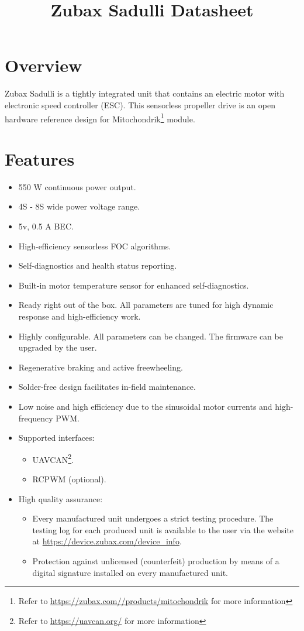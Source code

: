 \documentclass{zubaxdoc}
\title{Zubax Sadulli Datasheet}
\begin{document}
\frontmatter
\begin{titlepage}

\section*{Overview}

Zubax Sadulli is a tightly integrated unit that contains an electric motor with electronic speed controller (ESC). 
This sensorless propeller drive is an open hardware reference design for Mitochondrik\footnote{Refer to 
\url{https://zubax.com//products/mitochondrik} for more information} module.

\section*{Features}

\begin{itemize}
    \item 550 W continuous power output.
    \item 4S - 8S wide power voltage range.
    \item 5v, 0.5 A BEC.
    \item High-efficiency sensorless FOC algorithms.
    \item Self-diagnostics and health status reporting.
    \item Built-in motor temperature sensor for enhanced \allowbreak{}self-diagnostics.
    \item Ready right out of the box. All parameters are tuned for high dynamic response and high-efficiency work.      
    \item Highly configurable. All parameters can be changed. The firmware can be upgraded by the user.     
    \item Regenerative braking and active freewheeling. 
    \item Solder-free design facilitates in-field maintenance.
    \item Low noise and high efficiency due to the sinusoidal motor currents and \allowbreak{}high-frequency PWM.
    \item Supported interfaces:
    \begin{itemize}
        \item UAVCAN\footnote{Refer to \url{https://uavcan.org/} for more information}.
        \item RCPWM (optional).
    \end{itemize}
    \item High quality assurance:
    \begin{itemize}
        \item Every manufactured unit undergoes a strict testing procedure.
        The testing log for each produced unit is available to the user via the website at
        \url{https://device.zubax.com/device_info}.
        \item Protection against unlicensed (counterfeit) production by means of a digital signature installed on 
        every manufactured unit.
     \end{itemize}
\end{itemize}


\end{titlepage}
\end{document}
